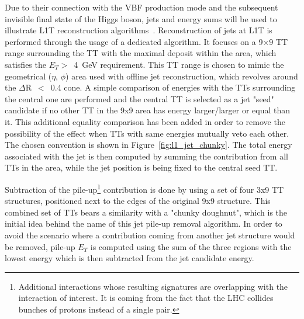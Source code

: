 \hspace{10pt} Due to their connection with the VBF production mode and the subsequent invisible final state of the Higgs boson, jets and energy sums will be used to illustrate L1T reconstruction algorithms~\cite{cms:l1_paper}\cite{Antoni}. Reconstruction of jets at L1T is performed through the usage of a dedicated algorithm. It focuses on a 9$\times$9 TT range surrounding the TT with the maximal deposit within the area, which satisfies the $E_T>$~4~GeV requirement. This TT range is chosen to mimic the geometrical ($\eta$, $\phi$) area used with offline jet reconstruction, which revolves around the $\Delta$R~$<$~0.4 cone. A simple comparison of energies with the TTs surrounding the central one are performed and the central TT is selected as a jet "seed" candidate if no other TT in the 9x9 area has energy larger/larger or equal than it. This additional equality comparison has been added in order to remove the possibility of the effect when TTs with same energies mutually veto each other. The chosen convention is shown in Figure~\ref{fig:l1_jet_chunky}. The total energy associated with the jet is then computed by summing the contribution from all TTs in the area, while the jet position is being fixed to the central seed TT. 

\hspace{10pt} Subtraction of the pile-up\footnote{Additional interactions whose resulting signatures are overlapping with the interaction of interest. It is coming from the fact that the LHC collides bunches of protons instead of a single pair.} contribution is done by using a set of four 3x9 TT structures, positioned next to the edges of the original 9x9 structure. This combined set of TTs bears a similarity with a "chunky doughnut", which is the initial idea behind the name of this jet pile-up removal algorithm. In order to avoid the scenario where a contribution coming from another jet structure would be removed, pile-up $E_T$ is computed using the sum of the three regions with the lowest energy which is then subtracted from the jet candidate energy.
 
